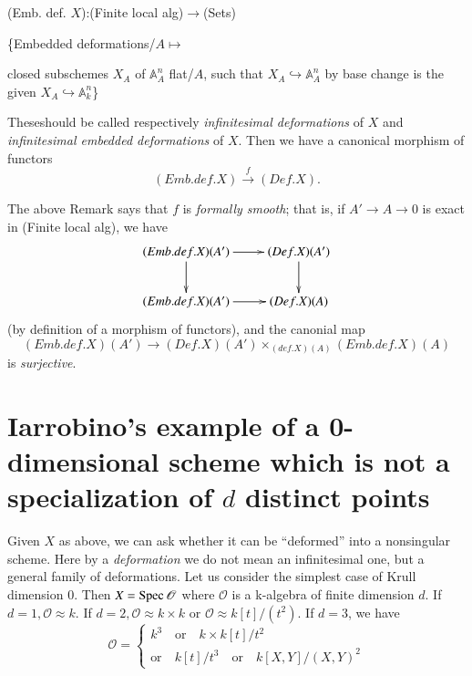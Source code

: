\medskip

(Emb. def. $X$):(Finite local alg)$\to$(Sets)


\{Embedded deformations/$A\mapsto$ {closed subschemes $X_{A}$ of $\mathbb{A}_{A}^{n}$ flat/$A$, such that $X_{A}\hookrightarrow \mathbb{A}_{A}^{n}$ by base change is the given $X_{A}\hookrightarrow \mathbb{A}_{k}^{n}$\}

These\pageoriginale should be called respectively {\em infinitesimal deformations} of $X$ and {\em infinitesimal embedded deformations} of $X$. Then we have a canonical morphism of functors
$$
(Emb. def. X)\xrightarrow{f}(Def. X).
$$

The above Remark says that $f$ is {\em formally smooth}; that is, if
$A'\rightarrow A \rightarrow 0$ is exact in (Finite local alg), we
have 
$$
\xymatrix{
(Emb. def. X)(A')\ar[d] \ar[r] & (Def. X)(A')\ar[d]\\
(Emb. def. X)(A')\ar[r] & (Def. X)(A)
}
$$
(by definition of a morphism of functors), and the canonial map
$$
(Emb. def. X)(A')\rightarrow(Def. X)(A')\times_{(def. X)(A)}(Emb. def. X)(A)
$$
is {\em surjective}.

\section[Iarrobino's example of a 0-dimensional scheme...]{Iarrobino's example of a 0-dimensional scheme which is not a specialization of $d$ distinct points}\label{part1-sec2}

Given $X$ as above, we can ask whether it can be ``deformed'' into a nonsingular scheme. Here by a {\em deformation} we do not mean an infinitesimal one, but a general family of deformations. Let us consider the simplest case of Krull dimension $0$. Then $X=\operatorname{Spec} \mathscr{O}$ where $\mathscr{O}$ is a k-algebra of finite dimension $d$. If $d=1, \mathscr{O}\approx k$. If $d=2, \mathscr{O}\approx k \times k$ or $\mathscr{O}\approx k[t]/(t^{2})$. If $d=3$, we have
$$
\mathscr{O}=
\begin{cases}
k^{3}\quad \text{or}\quad k \times k[t]/t^{2}\\
\text{or}\quad k[t]/t^{3}\quad \text{or}\quad k[X, Y]/(X, Y)^{2}
\end{cases}
$$

}

